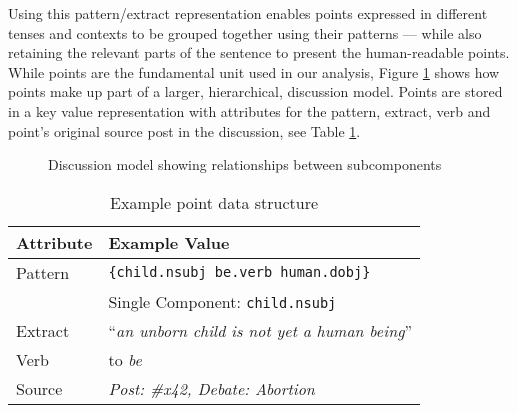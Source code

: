     Using this pattern/extract representation enables points expressed in different tenses and contexts to be grouped together using their patterns --- while also retaining the relevant parts of the sentence to present the human-readable points. While points are the fundamental unit used in our analysis, Figure \ref{fig:discmod} shows how points make up part of a larger, hierarchical, discussion model. Points are stored in a key value representation with attributes for the pattern, extract, verb and point's original source post in the discussion, see Table \ref{tab:point-keyval}.

    \begin{figure}
      \centering
      \caption{Discussion model showing relationships between subcomponents}

      \label{fig:discmod}
    \end{figure}

    \begin{table}[]
      \centering
      \caption{Example point data structure}
      \label{tab:point-keyval}
      \begin{tabular}{|l|l|}
        \hline
        \textbf{Attribute}       & \textbf{Example Value}                         \\ \hline
        Pattern                  & \texttt{\{child.nsubj be.verb human.dobj\}} \\
                                 & Single Component: \texttt{child.nsubj}         \\ \hline
        Extract                  & ``\textit{an unborn child is not yet a human being}''               \\ \hline
        Verb                     & to \textit{be}                               \\ \hline
        Source                   & \textit{Post: \#x42, Debate: Abortion}          \\ \hline
      \end{tabular}
    \end{table}

